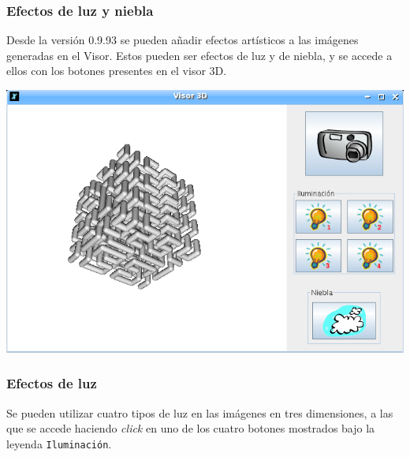 \subsubsection{Efectos de luz y niebla}

Desde la versi\'on 0.9.93 se pueden a\~nadir efectos art\'isticos a las
im\'agenes generadas en el Visor. Estos pueden ser efectos de luz y de niebla,
y se accede a ellos con los botones presentes en el visor 3D.
\begin{center}
   \includegraphics[scale=0.25]{Imagenes/05_Primitivas/Visor3D.png}
\end{center}

\subsubsection*{Efectos de luz}

Se pueden utilizar cuatro tipos de luz en las im\'agenes en tres dimensiones,
a las que se accede haciendo \textit{click} en uno de los cuatro botones mostrados
bajo la leyenda \texttt{Iluminaci\'on}. \\ 

